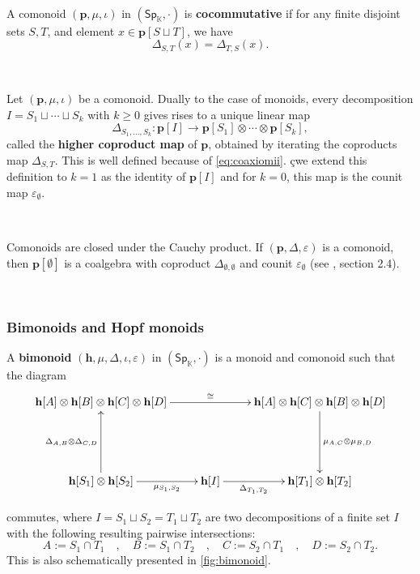 \documentclass[12pt, reqno]{amsart}
\theoremstyle{definition}
\newcommand{\Ssk}{\mathsf{Sp}_\Kb} %
\newcommand{\Kb}{\mathbb{K}}
\newcommand{\thh}{\mathbf{h}}
\newcommand{\tp}{\mathbf{p}}
\begin{document}
\

A comonoid $(\tp, \mu, \iota)$ in $(\Ssk, \cdot)$ is {\bf cocommutative} if for any finite disjoint sets $S, T$, and element $x\in \tp[S\sqcup T]$, we have
\begin{equation*}
    \Delta_{S,T}(x)=\Delta_{T,S}(x).
\end{equation*}

\

Let $(\tp, \mu, \iota)$ be a comonoid. Dually to the case of monoids, every decomposition $I=S_1 \sqcup \cdots \sqcup S_k$ with $k \geq 0$ gives rises to a unique linear map
\begin{equation}
    \Delta_{S_1, \hdots, S_k}: \tp[I] \to \tp[S_1]\otimes \cdots \otimes \tp[S_k],
\end{equation}
called the {\bf higher coproduct map} of $\tp$, obtained by iterating the coproducts map $\Delta_{S,T}$. 
This is well defined because of \cref{eq:coaxiomii}.
çwe extend this definition to $k=1$ as the identity of $\tp[I]$ and for $k=0$, this map is the counit map $\varepsilon_\emptyset$.

\

Comonoids are closed under the Cauchy product. 
If $(\tp, \Delta, \varepsilon)$ is a comonoid, then $\tp[\emptyset]$ is a coalgebra with coproduct $\Delta_{\emptyset, \emptyset}$ and counit $\varepsilon_\emptyset$ (see \cite{AM2013}, section 2.4).

\

\subsubsection{Bimonoids  and Hopf monoids}
A {\bf bimonoid} $(\thh, \mu, \Delta, \iota, \varepsilon)$ in $(\Ssk, \cdot)$ is a monoid and comonoid such that the diagram
\[\xymatrix{
\thh[A] \otimes \thh[B] \otimes \thh[C] \otimes \thh[D] \ar[rr]^-{\cong} && \thh[A] \otimes \thh[C] \otimes \thh[B] \otimes \thh[D] \ar[dd]^-{\mu_{A,C}\otimes\mu_{B,D}}\\
&&\\
\thh[S_1]\otimes \thh[S_2]\ar[uu]^-{\Delta_{A,B}\otimes \Delta_{C,D}} \ar[r]_-{\mu_{S_1, S_2}} & \thh[I] \ar[r]_-{\Delta_{T_1, T_2}} & \thh[T_1]\otimes \thh[T_2]
}\]

commutes, where $I=S_1\sqcup S_2=T_1 \sqcup T_2$ are two decompositions of a finite set $I$ with the following resulting pairwise intersections:
\[A:=S_1\cap T_1 \quad , \quad B:=S_1 \cap T_2 \quad , \quad C:=S_2 \cap T_1 \quad , \quad D:=S_2 \cap T_2.\]
This is also schematically presented in \cref{fig:bimonoid}.
\end{document}
